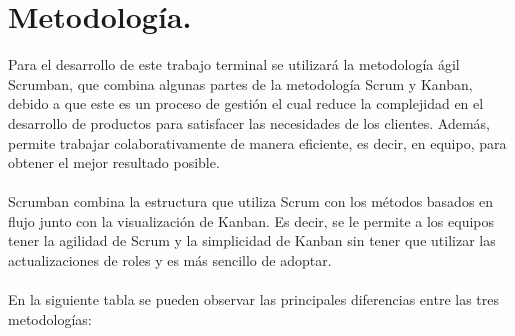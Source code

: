 \documentclass[12pt, a4paper, titlepage]{report}
\begin{document}
	    \section{Metodolog\'ia.}
	    Para el desarrollo de este trabajo terminal se utilizará la metodología ágil Scrumban, que combina algunas partes de la 
	    metodología Scrum y Kanban, debido a que este es un proceso de gestión el cual reduce la complejidad en el desarrollo de 
	    productos para satisfacer las necesidades de los clientes. Además, permite trabajar colaborativamente de manera eficiente, 
	    es decir, en equipo, para obtener el mejor resultado posible.\\\\
	    Scrumban combina la estructura que utiliza Scrum con los métodos basados en flujo junto con la visualización de Kanban.
	    Es decir, se le permite a los equipos tener la agilidad de Scrum y la simplicidad de Kanban sin tener que utilizar las 
	    actualizaciones de roles y es más sencillo de adoptar.\\\\
	    En la siguiente tabla se pueden observar las principales diferencias entre las tres metodologías:
	    
\end{document}
